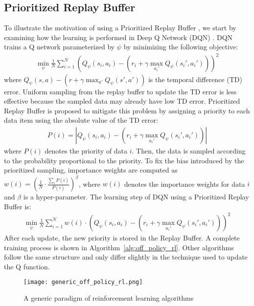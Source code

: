 \subsection{Prioritized Replay Buffer}
To illustrate the motivation of using a Prioritized Replay Buffer \cite{prioritized_experience_replay}, we start by examining how the learning is performed in Deep Q Network (DQN) \cite{dqn}. DQN trains a Q network parameterized by $\psi$ by minimizing the following objective:
\begin{align}
    \min_{\psi}\frac{1}{N}\sum_{i=1}^{N} (Q_{\psi}(s_i,a_i) - (r_i + \gamma \max_{a_i'}Q_{\psi}(s_i',a_i')))^2
\end{align}
where $Q_{\psi}(s,a) - (r + \gamma \max_{a'}Q_{\psi}(s',a'))$ is the temporal difference (TD) error. Uniform sampling from the replay buffer to update the TD error is less effective because the sampled data may already have low TD error. Prioritized Replay Buffer \cite{prioritized_experience_replay} is proposed to mitigate this problem by assigning a priority to each data item using the absolute value of the TD error:
\begin{align}
    P(i) = |Q_{\psi}(s_i,a_i) - (r_i + \gamma \max_{a_i'}Q_{\psi}(s_i',a_i'))|
\end{align}
where $P(i)$ denotes the priority of data $i$.
Then, the data is sampled according to the probability proportional to the priority. To fix the bias introduced by the prioritized sampling, importance weights are computed as $w(i) = (\frac{1}{N}\cdot\frac{\sum_{i}P(i)}{P(i)})^{\beta}$, where $w(i)$ denotes the importance weights for data $i$ and $\beta$ is a hyper-parameter. The learning step of DQN using a Prioritized Replay Buffer is:
\begin{align}
    \min_{\psi} \frac{1}{N}\sum_{i=1}^{N} w(i)\cdot(Q_{\psi}(s_i,a_i) - (r_i + \gamma \max_{a_i'}Q_{\psi}(s_i',a_i')))^2
\end{align}
After each update, the new priority is stored in the Replay Buffer. A complete training process is shown in Algorithm~\ref{alg:off_policy_rl}. Other algorithms follow the same structure and only differ slightly in the technique used to update the Q function.

\begin{figure}
    \centering
    \texttt{[image: generic\_off\_policy\_rl.png]}
    \caption{A generic paradigm of reinforcement learning algorithms}
    \label{fig:generic_off_policy_rl}
\end{figure}

